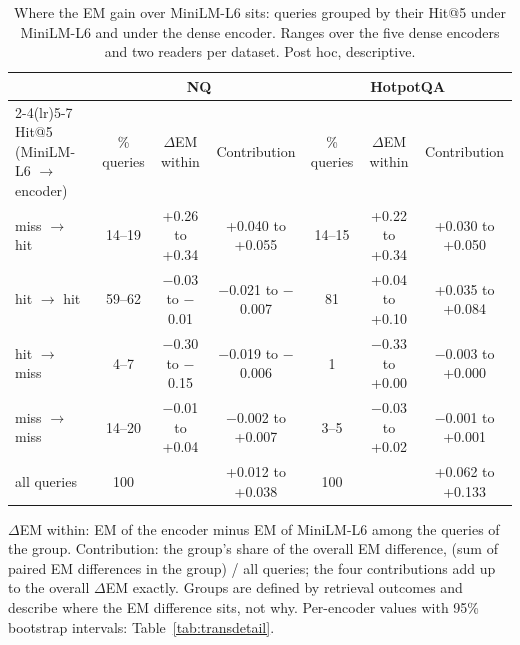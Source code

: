 \begin{table}[t]
\centering
\footnotesize
\caption{Where the EM gain over MiniLM-L6 sits: queries grouped by their Hit@5 under MiniLM-L6 and under the dense encoder. Ranges over the five dense encoders and two readers per dataset. Post hoc, descriptive.}
\label{tab:transitions}
\begin{tabular}{lcccccc}
\toprule
 & \multicolumn{3}{c}{NQ} & \multicolumn{3}{c}{HotpotQA} \\ \cmidrule(lr){2-4}\cmidrule(lr){5-7} Hit@5 (MiniLM-L6 $\to$ encoder) & \% queries & $\Delta$EM within & Contribution & \% queries & $\Delta$EM within & Contribution \\
\midrule
miss $\to$ hit & 14--19 & +0.26 to +0.34 & +0.040 to +0.055 & 14--15 & +0.22 to +0.34 & +0.030 to +0.050 \\
hit $\to$ hit & 59--62 & \ensuremath{-}0.03 to \ensuremath{-}0.01 & \ensuremath{-}0.021 to \ensuremath{-}0.007 & 81 & +0.04 to +0.10 & +0.035 to +0.084 \\
hit $\to$ miss & 4--7 & \ensuremath{-}0.30 to \ensuremath{-}0.15 & \ensuremath{-}0.019 to \ensuremath{-}0.006 & 1 & \ensuremath{-}0.33 to +0.00 & \ensuremath{-}0.003 to +0.000 \\
miss $\to$ miss & 14--20 & \ensuremath{-}0.01 to +0.04 & \ensuremath{-}0.002 to +0.007 & 3--5 & \ensuremath{-}0.03 to +0.02 & \ensuremath{-}0.001 to +0.001 \\
\midrule
all queries & 100 & & +0.012 to +0.038 & 100 & & +0.062 to +0.133 \\
\bottomrule
\end{tabular}
\par\smallskip\parbox{\linewidth}{\footnotesize $\Delta$EM within: EM of the encoder minus EM of MiniLM-L6 among the queries of the group. Contribution: the group's share of the overall EM difference, (sum of paired EM differences in the group) / all queries; the four contributions add up to the overall $\Delta$EM exactly. Groups are defined by retrieval outcomes and describe where the EM difference sits, not why. Per-encoder values with 95\% bootstrap intervals: Table~\ref{tab:transdetail}.}
\end{table}
